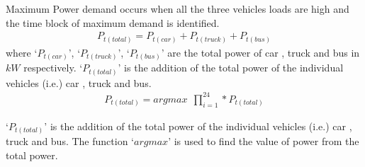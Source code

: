 	
	Maximum Power demand occurs when all the three vehicles loads are high and the time block of maximum demand is identified. 
	\begin{equation}
		\begin{split}
					P_{t(total)} = P_{t(car)} + P_{t(truck)} + P_{t(bus)}
		\end{split}
	\end{equation}	
where `$P_{t(car)}$', `$P_{t(truck)}$', `$P_{t(bus)}$' are the total power of car , truck and bus in $kW$ respectively. `$P_{t(total)}$' is the addition of the total  power of the individual vehicles (i.e.) car , truck and bus.
	\begin{equation}
		\begin{split}
				P_{t(total)} = argmax ~~\prod_{i=1}^{24} \ast P_{t(total)}
		\end{split}
	\end{equation}

`$P_{t(total)}$' is the addition of the total  power of the individual vehicles (i.e.) car , truck and bus. 
The function `$argmax$' is used to find the value of power from the total power. 
	

